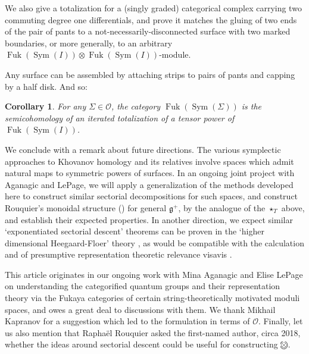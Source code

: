\documentclass{article}
\DeclareMathOperator{\Sym}{Sym}
\DeclareMathOperator{\Fuk}{Fuk}
\newcommand{\ootimes}{
\ooalign{$\otimes$\cr\hidewidth$\bigcirc$\hidewidth}}
\newtheorem{corollary}[theorem]{Corollary}
\theoremstyle{definition}
\begin{document}
    
    We also give a  totalization for a (singly graded) categorical complex carrying two commuting degree one differentials, and prove it matches the  gluing of two ends of the pair of pants to a not-necessarily-disconnected surface with two marked boundaries, or more generally, to an arbitrary $\Fuk(\Sym(I)) \otimes \Fuk(\Sym(I))$-module.  

    Any surface can be assembled by attaching strips to pairs of pants and capping by a half disk.  And so:
    
    \begin{corollary}
        For any $\Sigma \in \mathscr{O}$, the category $\Fuk(\Sym(\Sigma))$ is the semicohomology of an iterated totalization of a tensor power of $\Fuk(\Sym(I))$.
    \end{corollary}

    We conclude with a remark about   future directions.  The various symplectic approaches to Khovanov homology and its relatives \cite{Seidel-Smith, manolescu1, manolescu2, 
    abouzaid-smith-arc, abouzaid-smith:khovanov, 
    aganagic-knot-2, aganagic-icm,
    ALR,
    ADLSZ, 
    lepage-shende}
     involve spaces which admit natural maps to symmetric powers of surfaces.  In an ongoing joint project with Aganagic and LePage, we will apply a generalization of the methods developed here to construct similar sectorial decompositions for such spaces,  and construct Rouquier's monoidal structure (\cite{Rouquier-lecture}) for general $\mathfrak{g}^+$, by the analogue of the $\star_T$ above, and establish their expected properties.
    In another direction, we expect  similar `exponentiated sectorial descent' theorems can be proven in the `higher dimensional Heegaard-Floer' theory \cite{Colin-Honda-Tian}, as would be compatible with the calculation \cite{Honda-Tian-Yuan} and of presumptive representation theoretic relevance visavis \cite{Yuan-link}.
     

    \vspace{2mm}  
This article originates in our ongoing work with Mina Aganagic and Elise LePage on understanding the categorified quantum groups and their representation theory via the Fukaya categories of certain string-theoretically motivated moduli spaces, and owes a great deal to discussions with them.  We  thank Mikhail Kapranov for a suggestion which led to the formulation in terms of $\mathscr{O}$.  Finally, let us also mention that Rapha\"el Rouquier asked the first-named author, circa 2018, whether the ideas around sectorial descent could be useful for constructing $\ootimes$.
\end{document}
